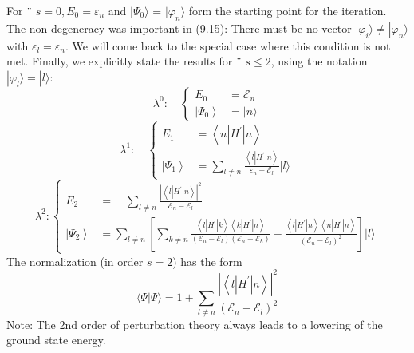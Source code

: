 For ¨ $s = 0, E_0 = \varepsilon_n$ and $|\Psi_0\rangle$ = $|\varphi_n\rangle$ form the starting point for the iteration. The non-degeneracy was important in (9.15): There must be no vector $|\varphi_i\rangle\neq|\varphi_n\rangle$ with $\varepsilon_l = \varepsilon_n$. We will come back to the special case where this condition is not met. Finally, we explicitly state the results for ¨ $s \leq 2$, using the notation $|\varphi_l\rangle=|l\rangle$:
\begin{equation}
\lambda^{0}: \quad\left\{\begin{aligned} E_{0} &=\mathcal{E}_{n} \\\left|\Psi_{0}\right\rangle &=|n\rangle \end{aligned}\right.
\end{equation}
\begin{equation}
\lambda^{1}: \quad\left\{\begin{aligned} E_{1} &=\left\langle n\left|H^{\prime}\right| n\right\rangle \\\left|\Psi_{1}\right\rangle &=\sum_{l \neq n} \frac{\left\langle l\left|H^{\prime}\right| n\right\rangle}{\varepsilon_{n}-\mathcal{E}_{l}}|l\rangle \end{aligned}\right.
\end{equation}
\begin{equation}
\lambda^{2}:\left\{\begin{aligned} E_{2} &=\quad \sum_{l \neq n} \frac{\left|\left\langle l\left|H^{\prime}\right| n\right\rangle\right|^{2}}{\mathcal{E}_{n}-\mathcal{E}_{l}} \\\left|\Psi_{2}\right\rangle &=\sum_{l \neq n}\left[\sum_{k \neq n} \frac{\left\langle l\left|H^{\prime}\right| k\right\rangle\left\langle k\left|H^{\prime}\right| n\right\rangle}{\left(\mathcal{E}_{n}-\mathcal{E}_{l}\right)\left(\mathcal{E}_{n}-\mathcal{E}_{k}\right)}-\frac{\left\langle l\left|H^{\prime}\right| n\right\rangle\left\langle n\left|H^{\prime}\right| n\right\rangle}{\left(\mathcal{E}_{n}-\mathcal{E}_{l}\right)^{2}}\right]|l\rangle \end{aligned}\right.
\end{equation}
The normalization (in order $s = 2$) has the form
\begin{equation}
    \langle\Psi | \Psi\rangle= 1+\sum_{l \neq n} \frac{\left|\left\langle l\left|H^{\prime}\right| n\right\rangle\right|^{2}}{\left(\mathcal{E}_{n}-\mathcal{E}_{l}\right)^{2}}
    \end{equation}
Note: The 2nd order of perturbation theory always leads to a lowering of the ground state energy.
